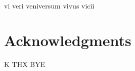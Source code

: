 \chapter*{}


\begin{center}
vi veri veniversum vivus vicii
\end{center}


\chapter*{Acknowledgments}

K THX BYE

\newpage